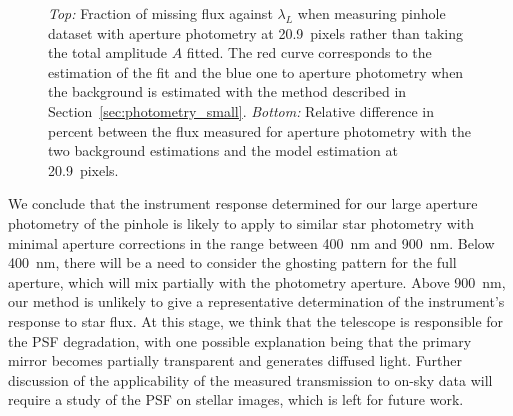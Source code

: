 \begin{figure}%
     \centering
     \caption{\textit{Top:} Fraction of missing flux against $\lambda_L$ when measuring \spinhole pinhole dataset with aperture photometry at \SI{20.9}{pixels} rather than taking the total amplitude $A$ fitted. The red curve corresponds to the estimation of the fit and the blue one to aperture photometry when the background is estimated with the method described in Section~\ref{sec:photometry_small}. \textit{Bottom:} Relative difference in percent between the flux measured for aperture photometry with the two background estimations and the model estimation at \SI{20.9}{pixels}.}
     \label{fig:bias_aperture}
\end{figure}

%
% 
We conclude that the instrument response determined for our large aperture photometry of the \spinhole pinhole is likely to apply to similar star photometry with minimal aperture corrections in the range between \SI{400}{\nano\meter} and \SI{900}{\nano\meter}. Below \SI{400}{\nano\meter}, there will be a need to consider the ghosting pattern for the full aperture, which will mix partially with the photometry aperture. Above \SI{900}{\nano\meter}, our method is unlikely to give a representative determination of the instrument's response to star flux. At this stage, we think that the \SD telescope is responsible for the PSF degradation, with one possible explanation being that the primary mirror becomes partially transparent and generates diffused light. Further discussion of the applicability of the measured transmission to on-sky data will require a study of the PSF on stellar images, which is left for future work.


